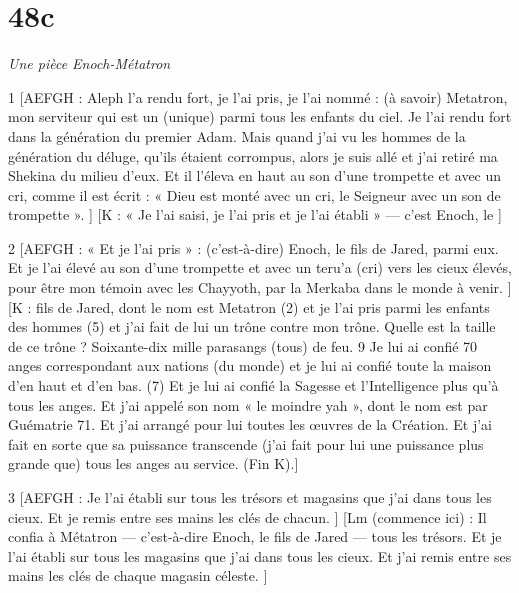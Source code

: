 \chapter{48c}

\par \textit{Une pièce Enoch-Métatron}

\par 1 [AEFGH : Aleph l'a rendu fort, je l'ai pris, je l'ai nommé : (à savoir) Metatron, mon serviteur qui est un (unique) parmi tous les enfants du ciel. Je l'ai rendu fort dans la génération du premier Adam. Mais quand j'ai vu les hommes de la génération du déluge, qu'ils étaient corrompus, alors je suis allé et j'ai retiré ma Shekina du milieu d'eux. Et il l'éleva en haut au son d'une trompette et avec un cri, comme il est écrit : « Dieu est monté avec un cri, le Seigneur avec un son de trompette ». ] [K : « Je l'ai saisi, je l'ai pris et je l'ai établi » — c'est Enoch, le ]


\par 2 [AEFGH : « Et je l'ai pris » : (c'est-à-dire) Enoch, le fils de Jared, parmi eux. Et je l'ai élevé au son d'une trompette et avec un teru'a (cri) vers les cieux élevés, pour être mon témoin avec les Chayyoth, par la Merkaba dans le monde à venir. ] [K : fils de Jared, dont le nom est Metatron (2) et je l'ai pris parmi les enfants des hommes (5) et j'ai fait de lui un trône contre mon trône. Quelle est la taille de ce trône ? Soixante-dix mille parasangs (tous) de feu. 9 Je lui ai confié 70 anges correspondant aux nations (du monde) et je lui ai confié toute la maison d'en haut et d'en bas. (7) Et je lui ai confié la Sagesse et l'Intelligence plus qu'à tous les anges. Et j'ai appelé son nom « le moindre yah », dont le nom est par Guématrie 71. Et j'ai arrangé pour lui toutes les œuvres de la Création. Et j’ai fait en sorte que sa puissance transcende (j’ai fait pour lui une puissance plus grande que) tous les anges au service. (Fin K).]

\par 3 [AEFGH : Je l'ai établi sur tous les trésors et magasins que j'ai dans tous les cieux. Et je remis entre ses mains les clés de chacun. ] [Lm (commence ici) : Il confia à Métatron — c'est-à-dire Enoch, le fils de Jared — tous les trésors. Et je l'ai établi sur tous les magasins que j'ai dans tous les cieux. Et j'ai remis entre ses mains les clés de chaque magasin céleste. ]

